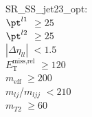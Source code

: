 SR\_SS\_jet23\_opt: \\
$\pt^{l1}$ $\geq 25$ \\
$\pt^{l2}$ $\geq 25$ \\
$|\Delta\eta_{ll}|$ $<1.5$ \\
$E_{\text{T}}^{\text{miss,rel}}$ $\geq 120$ \\
$m_{\text{eff}}$ $\geq 200$ \\
$m_{lj}$/$m_{ljj}$ $<210$ \\
$m_{T2}$ $\geq 60$ \\
